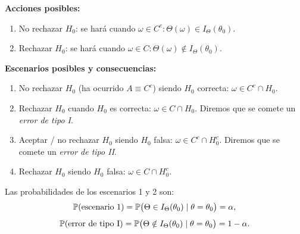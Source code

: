 \begin{definicion}
\textbf{Acciones posibles:}
\begin{enumerate}
  \item No rechazar $H_0$: se hará cuando $\omega \in C^c : \Theta(\omega) \in I_\Theta(\theta_0)$.
  \item Rechazar $H_0$: se hará cuando $\omega \in C : \Theta(\omega) \notin I_\Theta(\theta_0)$.
\end{enumerate}

\noindent \textbf{Escenarios posibles y consecuencias:}
\begin{enumerate}
  \item No rechazar $H_0$ (ha ocurrido $A \equiv C^c$) siendo $H_0$ correcta: $\omega \in C^c \cap H_0$.
  \item Rechazar $H_0$ cuando $H_0$ es correcta: $\omega \in C \cap H_0$. Diremos que se comete un \emph{error de tipo I}.
  \item Aceptar / no rechazar $H_0$ siendo $H_0$ falsa: $\omega \in C^c \cap H_0^c$. Diremos que se comete un \emph{error de tipo II}.
  \item Rechazar $H_0$ siendo $H_0$ falsa: $\omega \in C \cap H_0^c$.
\end{enumerate}
Las probabilidades de los escenarios 1 y 2 son:
\[
  \mathbb{P}(\text{escenario 1}) = \mathbb{P}\bigl(\Theta \in I_\Theta(\theta_0) \mid \theta = \theta_0\bigr) = \alpha,
\]
\[
  \mathbb{P}(\text{error de tipo I}) = \mathbb{P}\bigl(\Theta \notin I_\Theta(\theta_0) \mid \theta = \theta_0\bigr) = 1 - \alpha.
\]
\end{definicion}

